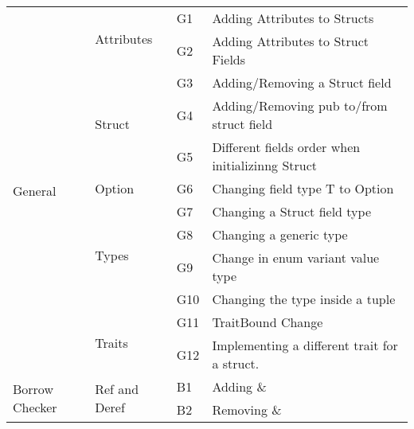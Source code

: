\begin{table}[]
\begin{tabular}{|l|l|l|l|}
\multirow{12}{*}{General}        
& \multirow{2}{*}{Attributes}    & G1  & Adding Attributes to Structs                                        \\
                                 &                                & G2  & Adding Attributes to Struct Fields                                  \\\cline{2-3}
                                 & \multirow{3}{*}{Struct}        & G3  & Adding/Removing a Struct field                                      \\
                                 &                                & G4  & Adding/Removing pub to/from struct field                            \\
                                 &                                & G5  & Different fields order when initializinng Struct                       \\\cline{2-3}
                                 & Option                         & G6  & Changing field type T to Option                                          \\\cline{2-3}
                                 & \multirow{4}{*}{Types}         & G7  & Changing a Struct field type                                        \\
                                 &                                & G8  & Changing a generic type                                             \\
                                 &                                & G9  & Change in enum variant value type                                   \\
                                 &                                & G10 & Changing the type inside a tuple                                         \\\cline{2-3}
                                 & \multirow{2}{*}{Traits}        & G11 & TraitBound Change                                                   \\
                                 &                                & G12 & Implementing a different trait for a struct.                            \\\cline{1-3}
\multirow{13}{*}{Borrow Checker} & \multirow{4}{*}{Ref and Deref} & B1  & Adding \&                                                           \\
                                 &                                & B2  & Removing \&                                                         \\

\end{tabular}
\end{table}
